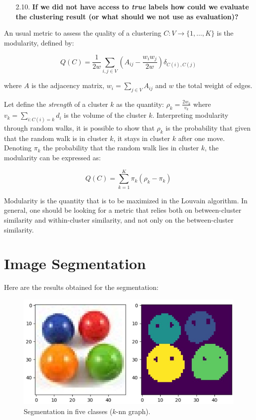 \documentclass[a4paper, 11pt]{article}
\begin{document}
\begin{itemize}
    \item[2.10.] \textbf{If we did not have access to \textit{true} labels how could we evaluate the clustering result (or what should we not use as evaluation)?}
\end{itemize}

    An usual metric to assess the quality of a clustering $C : V \longrightarrow \lbrace 1, \dots, K \rbrace$ is the modularity, defined by:

    \[ Q(C) = \frac{1}{2w} \sum_{i, j \in V} \left( A_{ij} - \frac{w_{i}w_{j}}{2w} \right) \delta_{C(i), C(j)} \]

    \noindent where $A$ is the adjacency matrix, $w_{i} = \sum_{j \in V} A_{ij}$ and $w$ the total weight of edges.

    Let define the \emph{strength} of a cluster $k$ as the quantity: $\rho_{k} = \frac{2 w_{k}}{v_{k}}$ where $v_{k} = \sum_{i: C(i) = k} d_{i}$ is the volume of the cluster $k$. Interpreting modularity through random walks, it is possible to show that $\rho_{k}$ is the probability that given that the random walk is in cluster $k$, it stays in cluster $k$ after one move. Denoting $\pi_{k}$ the probability that the random walk lies in cluster $k$, the modularity can be expressed as:

    \[ Q(C) = \sum_{k=1}^{K} \pi_{k} \left( \rho_{k} - \pi_{k} \right) \]

    Modularity is the quantity that is to be maximized in the Louvain algorithm. In general, one should be looking for a metric that relies both on between-cluster similarity and within-cluster similarity, and not only on the between-cluster similarity.

\section{Image Segmentation}

    Here are the results obtained for the segmentation:

    \begin{figure}[!ht]
        \centering
        \includegraphics[scale=0.65]{images/four_elements_segmentation.jpg}
        \caption{Segmentation in five classes ($k$-nn graph).}
        \label{fig:four-elements-segmentation}
    \end{figure}
\end{document}
